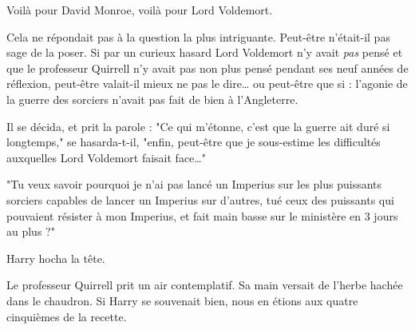 Voilà pour David Monroe, voilà pour Lord Voldemort.

Cela ne répondait pas à la question la plus intriguante. Peut-être n'était-il pas sage de la poser. Si par un curieux hasard Lord Voldemort n'y avait \emph{pas}  pensé et que le professeur Quirrell n'y avait pas non plus pensé pendant ses neuf années de réflexion, peut-être valait-il mieux ne pas le dire… ou peut-être que si : l'agonie de la guerre des sorciers n'avait pas fait de bien à l'Angleterre.

Il se décida, et prit la parole : "Ce qui m'étonne, c'est que la guerre ait duré si longtemps," se hasarda-t-il, "enfin, peut-être que je sous-estime les difficultés auxquelles Lord Voldemort faisait face…"

"Tu veux savoir pourquoi je n'ai pas lancé un Imperius sur les plus puissants sorciers capables de lancer un Imperius sur d'autres, tué ceux des puissants qui pouvaient résister à mon Imperius, et fait main basse sur le ministère en 3 jours au plus ?"

Harry hocha la tête.

Le professeur Quirrell prit un air contemplatif. Sa main versait de l'herbe hachée dans le chaudron. Si Harry se souvenait bien, nous en étions aux quatre cinquièmes de la recette.

